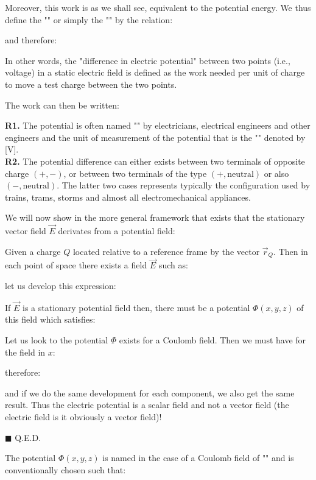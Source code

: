 	Moreover, this work is as we shall see, equivalent to the potential energy. We thus define the "" or simply the "" by the relation:
	
	and therefore:
	
	In other words, the "difference in electric potential" between two points (i.e., voltage) in a static electric field is defined as the work needed per unit of charge to move a test charge between the two points. 

	The work can then be written\label{electrostatic potential energy}:
	
	\begin{tcolorbox}[title=Remarks,colframe=black,arc=10pt]
	\textbf{R1.} The potential is often named "" by electricians, electrical engineers and other engineers and the unit of measurement of the potential that is the "" denoted by [V].\\
	
	\textbf{R2.} The potential difference can either exists between two terminals of opposite charge $(+, -)$, or between two terminals of the type $(+, \text{neutral})$ or also $(-, \text{neutral})$. The latter two cases represents typically the configuration used by trains, trams, storms and almost all electromechanical appliances.
	\end{tcolorbox}
	\begin{theorem}
	We will now show in the more general framework that exists that the stationary vector field $\vec{E}$ derivates from a potential field:
	\end{theorem}
	\begin{dem}
	Given a charge $Q$ located relative to a reference frame by the vector $\vec{r}_Q$. Then in each point of space there exists a field $\vec{E}$ such as:
	
	let us develop this expression:
	
	If $\vec{E}$ is a stationary potential field then, there must be a potential $\Phi(x,y,z)$ of this field which satisfies:
	
	Let us look to the potential $\Phi$ exists for a Coulomb field. Then we must have for the field in $x$:
	
	therefore:
	
	and if we do the same development for each component, we also get the same result. Thus the electric potential is a scalar field and not a vector field (the electric field is it obviously a vector field)!
	\begin{flushright}
		$\blacksquare$  Q.E.D.
	\end{flushright}
	\end{dem}
	The potential $\Phi(x,y,z)$ is named in the case of a Coulomb field of "" and is conventionally chosen such that:
	
